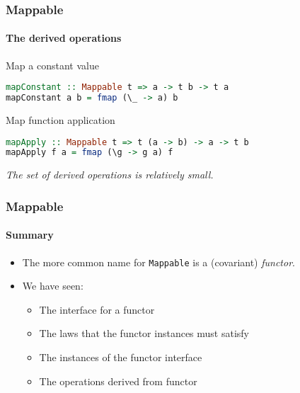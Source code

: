 \begin{frame}[fragile]
\frametitle{Mappable}
\framesubtitle{The derived operations}
\begin{block}{Map a constant value}
\begin{lstlisting}[style=language,language=haskell]
mapConstant :: Mappable t => a -> t b -> t a
mapConstant a b = fmap (\_ -> a) b
\end{lstlisting}
\end{block}
\begin{block}{Map function application}
\begin{lstlisting}[style=language,language=haskell]
mapApply :: Mappable t => t (a -> b) -> a -> t b
mapApply f a = fmap (\g -> g a) f
\end{lstlisting}
\end{block}
\emph{The set of derived operations is relatively small.}
\end{frame}

\begin{frame}[fragile]
\frametitle{Mappable}
\framesubtitle{Summary}
\begin{itemize}
\item The more common name for \lstinline{Mappable} is a (covariant) \emph{functor}.
\item We have seen:
  \begin{itemize}
  \item The interface for a functor
  \item The laws that the functor instances must satisfy
  \item The instances of the functor interface
  \item The operations derived from functor
  \end{itemize}
\end{itemize}
\end{frame}
